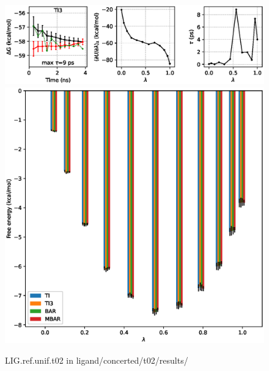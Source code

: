 \documentclass[journal=jctcce,manuscript=article,hyperref=false]{achemso}
\begin{document}
\clearpage
\pagebreak
\begin{figure}
\includegraphics[clip,width=6in]{ligand.concerted.t02.results..GvsT.eps}\vspace{-0.3cm}
\includegraphics[clip,width=6in]{ligand.concerted.t02.results..GvsL.eps}\vspace{-0.3cm}
\caption{LIG.ref.unif.t02 in ligand/concerted/t02/results/}
\end{figure}
\end{document}
